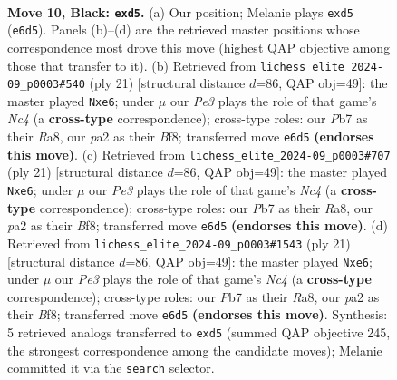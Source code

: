 \documentclass[11pt]{article}
\begin{document}
\begin{figure}[p]\centering
\begin{subfigure}{0.46\textwidth}\centering
\resizebox{\linewidth}{!}{%
\newchessgame
\chessboard[
  setfen={r1bqkb1r/pp3ppp/2npp3/3BP3/3P3P/5N2/PP3PP1/RNBQ1RK1 b q - 1 10},
  showmover=false,
  pgfstyle=straightmove, color=movearrow, markmove={e6-d5}
]}
\caption{}
\end{subfigure}\hfill
\begin{subfigure}{0.46\textwidth}\centering
\resizebox{\linewidth}{!}{%
\newchessgame
\chessboard[
  setfen={r2qkb1r/2p2ppp/p1n1B3/1pn1P3/3p4/2P2N2/PP1N1PPP/R1BQ1RK1 b kq - 0 11},
  showmover=false,
  pgfstyle=straightmove, color=movearrow, markmove={c5-e6}
]}
\caption{}
\end{subfigure}
\\[4pt]
\begin{subfigure}{0.46\textwidth}\centering
\resizebox{\linewidth}{!}{%
\newchessgame
\chessboard[
  setfen={r2qkb1r/2p2ppp/p1n1B3/1pn1P3/3p4/2P2N2/PP1N1PPP/R1BQ1RK1 b kq - 0 11},
  showmover=false,
  pgfstyle=straightmove, color=movearrow, markmove={c5-e6}
]}
\caption{}
\end{subfigure}\hfill
\begin{subfigure}{0.46\textwidth}\centering
\resizebox{\linewidth}{!}{%
\newchessgame
\chessboard[
  setfen={r2qkb1r/2p2ppp/p1n1B3/1pn1P3/3p4/2P2N2/PP1N1PPP/R1BQ1RK1 b kq - 0 11},
  showmover=false,
  pgfstyle=straightmove, color=movearrow, markmove={c5-e6}
]}
\caption{}
\end{subfigure}
\caption{\textbf{Move 10, Black: \texttt{exd5}.} (a) Our position; Melanie plays \texttt{exd5} (\texttt{e6d5}). Panels (b)--(d) are the retrieved master positions whose correspondence most drove this move (highest QAP objective among those that transfer to it). (b) Retrieved from \texttt{lichess\_elite\_2024-09\_p0003\#540} (ply 21) [structural distance $d$=86, QAP obj=49]: the master played \texttt{Nxe6}; under $\mu$ our \emph{Pe3} plays the role of that game's \emph{Nc4} (a \textbf{cross-type} correspondence); cross-type roles: our \emph{P}b7 as their \emph{R}a8, our \emph{p}a2 as their \emph{B}f8; transferred move \texttt{e6d5} \textbf{(endorses this move)}. (c) Retrieved from \texttt{lichess\_elite\_2024-09\_p0003\#707} (ply 21) [structural distance $d$=86, QAP obj=49]: the master played \texttt{Nxe6}; under $\mu$ our \emph{Pe3} plays the role of that game's \emph{Nc4} (a \textbf{cross-type} correspondence); cross-type roles: our \emph{P}b7 as their \emph{R}a8, our \emph{p}a2 as their \emph{B}f8; transferred move \texttt{e6d5} \textbf{(endorses this move)}. (d) Retrieved from \texttt{lichess\_elite\_2024-09\_p0003\#1543} (ply 21) [structural distance $d$=86, QAP obj=49]: the master played \texttt{Nxe6}; under $\mu$ our \emph{Pe3} plays the role of that game's \emph{Nc4} (a \textbf{cross-type} correspondence); cross-type roles: our \emph{P}b7 as their \emph{R}a8, our \emph{p}a2 as their \emph{B}f8; transferred move \texttt{e6d5} \textbf{(endorses this move)}. Synthesis: 5 retrieved analogs transferred to \texttt{exd5} (summed QAP objective 245, the strongest correspondence among the candidate moves); Melanie committed it via the \texttt{search} selector.}
\label{fig:thought-m19}
\end{figure}
\end{document}

